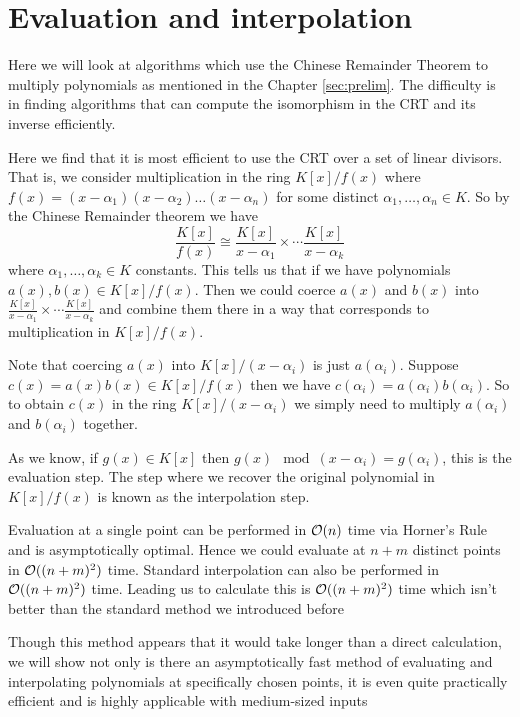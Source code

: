 \chapter{Evaluation and interpolation}\label{chp-interp}

Here we will look at algorithms which use the Chinese Remainder Theorem to multiply polynomials as mentioned in the Chapter \ref{sec:prelim}. The difficulty is in finding algorithms that can compute the isomorphism in the CRT and its inverse efficiently.

Here we find that it is most efficient to use the CRT over a set of linear divisors. That is, we consider multiplication in the ring $K[x] / f(x)$ where $f(x) = (x - \alpha_1)(x - \alpha_2) \ldots (x - \alpha_n)$ for some distinct $\alpha_1, \ldots, \alpha_n \in K$. So by the Chinese Remainder theorem we have
\[
    \frac{K[x]}{f(x)} \cong \frac{K[x]}{x - \alpha_1} \times \cdots \frac{K[x]}{x - \alpha_k}
\]
where $\alpha_1, \ldots, \alpha_k \in K$ constants. This tells us that if we have polynomials $a(x), b(x) \in K[x] / f(x)$. Then we could coerce $a(x)$ and $b(x)$ into $\frac{K[x]}{x - \alpha_1} \times \cdots \frac{K[x]}{x - \alpha_k}$ and combine them there in a way that corresponds to multiplication in $K[x] / f(x)$. 

Note that coercing $a(x)$ into $K[x] / (x - \alpha_i)$ is just $a(\alpha_i)$. Suppose $c(x) = a(x)b(x) \in K[x] / f(x)$ then we have $c(\alpha_i) = a(\alpha_i)b(\alpha_i)$. So to obtain $c(x)$ in the ring $K[x] / (x - \alpha_i)$ we simply need to multiply $a(\alpha_i)$ and $b(\alpha_i)$ together.

As we know, if $g(x) \in K[x]$ then $g(x) \mod (x - \alpha_i) = g(\alpha_i)$, this is the evaluation step. The step where we recover the original polynomial in $K[x]/f(x)$ is known as the interpolation step.

Evaluation at a single point can be performed in $\mathcal O(n)$ time via Horner's Rule and is asymptotically optimal. Hence we could evaluate at $n + m$ distinct points in $\mathcal O((n + m)^2)$ time. Standard interpolation can also be performed in $\mathcal O((n+m)^2)$ time. Leading us to calculate this is $\mathcal O((n + m)^2)$ time which isn't better than the standard method we introduced before

Though this method appears that it would take longer than a direct calculation, we will show not only is there an asymptotically fast method of evaluating and interpolating polynomials at specifically chosen points, it is even quite practically efficient and is highly applicable with medium-sized inputs

